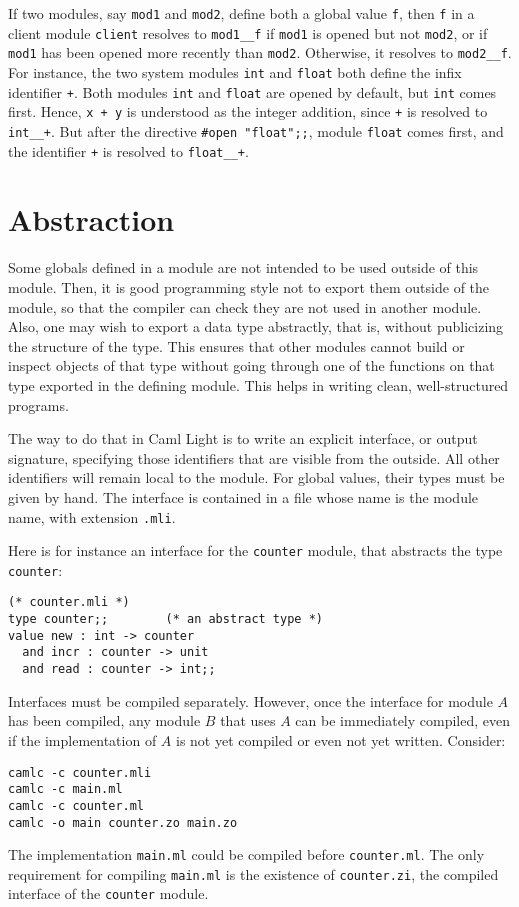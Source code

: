 If two modules, say \verb"mod1" and \verb"mod2", define both a global
value \verb"f", then \verb"f" in a client module \verb"client"
resolves to \verb"mod1__f" if \verb"mod1" is opened but not \verb"mod2", or
if \verb"mod1" has been opened more recently than \verb"mod2". Otherwise, it resolves to \verb"mod2__f".
For instance, the two system modules \verb"int" and \verb"float" both
define the infix identifier
\verb"+". Both modules \verb"int" and \verb"float" are opened by
default, but \verb"int" comes first. Hence, \verb"x + y" is understood
as the integer addition, since \verb"+" is resolved to \verb"int__+".
But after the directive
\verb|#open "float";;|, module \verb"float" comes first, and the
identifier \verb"+" is resolved to \verb"float__+". 

\section{Abstraction}

Some globals defined in a module are not intended to be used outside
of this module. Then, it is good programming style not to export them
outside of the module, so that the compiler can check they are not used in
another module. Also, one may wish to export a data type abstractly,
that is, without publicizing the structure of the type. This ensures
that other modules cannot build or inspect objects of that type
without going through one of the functions on that type exported in
the defining module. This helps in writing clean,
well-structured programs.

The way to do that in Caml Light is to write an explicit interface, or
output signature, specifying those identifiers that are visible from
the outside. All other identifiers will remain local to the module.
For global values, their types must be given by hand. The interface is
contained in a file whose name is the module name, with extension
\verb".mli".

Here is for instance an interface for the \verb"counter" module, that
abstracts the type \verb"counter":
\begin{verbatim}
(* counter.mli *)
type counter;;        (* an abstract type *)
value new : int -> counter
  and incr : counter -> unit
  and read : counter -> int;;
\end{verbatim}

Interfaces must be compiled separately. However, once the interface for
module $A$ has been compiled, any module $B$ that uses $A$ can be
immediately compiled, even if the implementation of $A$ is not yet
compiled or even not yet written. Consider:
\begin{verbatim}
camlc -c counter.mli
camlc -c main.ml
camlc -c counter.ml
camlc -o main counter.zo main.zo
\end{verbatim}
The implementation \verb|main.ml| could be compiled before
\verb|counter.ml|. The only requirement for compiling \verb|main.ml|
is the existence of \verb|counter.zi|, the compiled interface of the
\verb|counter| module.

